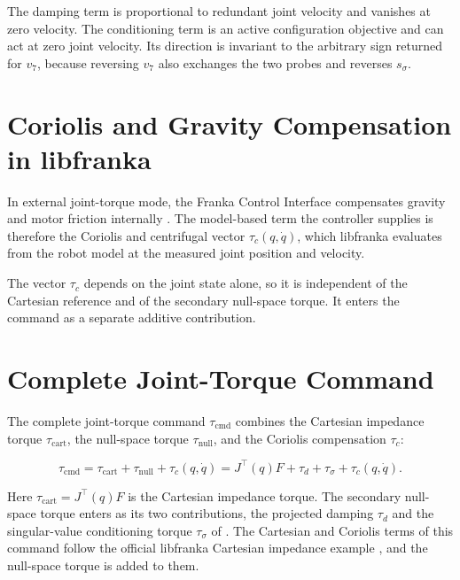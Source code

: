 The damping term is proportional to redundant joint velocity and vanishes at
zero velocity. The conditioning term is an active configuration objective and
can act at zero joint velocity.
Its direction is invariant to the arbitrary sign returned for \mbox{\(v_7\)},
because reversing \mbox{\(v_7\)} also exchanges the two probes and reverses
\mbox{\(s_\sigma\)}.


\section{Coriolis and Gravity Compensation in libfranka}
\label{subsec:coriolis_gravity_compensation}

In external joint-torque mode, the Franka Control Interface compensates gravity
and motor friction internally \mbox{\citep{FrankaFCI2023}}. The model-based term
the controller supplies is therefore the Coriolis and centrifugal vector
\mbox{\(\tau_c(q,\dot q)\)}, which libfranka evaluates from the robot model at
the measured joint position and velocity.

The vector \mbox{\(\tau_c\)} depends on the joint state alone, so it is
independent of the Cartesian reference and of the secondary null-space torque.
It enters the command as a separate additive contribution.

\section{Complete Joint-Torque Command}
\label{sec:complete_joint_torque_command}

The complete joint-torque command \mbox{\(\tau_{\mathrm{cmd}}\)} combines the
Cartesian impedance torque \mbox{\(\tau_{\mathrm{cart}}\)}, the null-space torque
\mbox{\(\tau_{\mathrm{null}}\)}, and the Coriolis compensation \mbox{\(\tau_c\)}:

\begin{equation}
\tau_{\mathrm{cmd}}
=
\tau_{\mathrm{cart}}
+
\tau_{\mathrm{null}}
+
\tau_c(q,\dot q)
=
J^\top(q)F
+
\tau_d+\tau_\sigma
+
\tau_c(q,\dot q).
\label{eq:nullspace_complete_torque_command}
\end{equation}

Here \mbox{\(\tau_{\mathrm{cart}}=J^\top(q)F\)} is the Cartesian impedance
torque. The secondary null-space torque enters as its two contributions, the
projected damping \mbox{\(\tau_d\)} and the singular-value conditioning torque
\mbox{\(\tau_\sigma\)} of \mbox{}. The Cartesian and
Coriolis terms of this command follow the official libfranka Cartesian
impedance example \mbox{\cite{libfrankaCartesianExample}}, and the null-space
torque is added to them.
